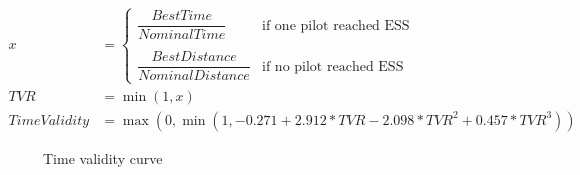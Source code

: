 \documentclass[gap.tex]{subfiles}
\begin{document}
\begin{align*}
    x &=
    \begin{cases}
        \dfrac{BestTime}{NominalTime}
        &\text{if one pilot reached ESS} \\\\
        \dfrac{BestDistance}{NominalDistance}
        &\text{if no pilot reached ESS}
    \end{cases} \\
    TVR &= \min(1, x) \\
    TimeValidity &= \max(0, \min(1, -0.271 + 2.912 * TVR - 2.098 * TVR^2 + 0.457 * TVR^3))
\end{align*}

\begin{figure}[!ht]
    
    \caption{Time validity curve}
\end{figure}
\end{document}
